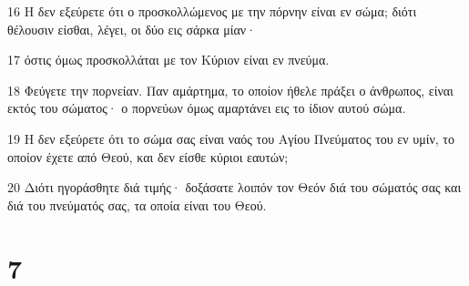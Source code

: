 \par 16 Η δεν εξεύρετε ότι ο προσκολλώμενος με την πόρνην είναι εν σώμα; διότι θέλουσιν είσθαι, λέγει, οι δύο εις σάρκα μίαν·
\par 17 όστις όμως προσκολλάται με τον Κύριον είναι εν πνεύμα.
\par 18 Φεύγετε την πορνείαν. Παν αμάρτημα, το οποίον ήθελε πράξει ο άνθρωπος, είναι εκτός του σώματος· ο πορνεύων όμως αμαρτάνει εις το ίδιον αυτού σώμα.
\par 19 Η δεν εξεύρετε ότι το σώμα σας είναι ναός του Αγίου Πνεύματος του εν υμίν, το οποίον έχετε από Θεού, και δεν είσθε κύριοι εαυτών;
\par 20 Διότι ηγοράσθητε διά τιμής· δοξάσατε λοιπόν τον Θεόν διά του σώματός σας και διά του πνεύματός σας, τα οποία είναι του Θεού.

\chapter{7}

